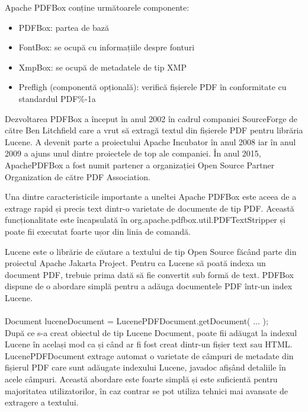 \documentclass[12pt]{book}
\begin{document}
Apache PDFBox conține următoarele componente:
\begin{addmargin}[4em]{1em}
	\begin{itemize}
		\item PDFBox: partea de bază
		\item FontBox: se ocupă cu informațiile despre fonturi
		\item XmpBox: se ocupă de metadatele de tip XMP
		\item Prefligh (componentă opțională): verifică fișierele PDF în conformitate cu standardul PDF\%-1a \cite{PDFBoxOfficial}
\end{itemize}
\end{addmargin}

Dezvoltarea PDFBox a început în anul 2002 în cadrul companiei SourceForge de către Ben Litchfield care a vrut să extragă textul din fișierele PDF pentru librăria Lucene. A devenit parte a proiectului Apache Incubator în anul 2008 iar în anul 2009 a ajuns unul dintre proiectele de top ale companiei. În anul 2015, ApachePDFBox a fost numit partener a organizației Open Source Partner Organization de către PDF Association.

Una dintre caracteristicile importante a uneltei Apache PDFBox este aceea de a extrage rapid și precis text dintr-o varietate de documente de tip PDF. Această funcționalitate este încapsulată în org.apache.pdfbox.util.PDFTextStripper și poate fii executat foarte ușor din linia de comandă. 

Lucene este o librărie de căutare a textului de tip Open Source făcând parte din proiectul Apache Jakarta Project. Pentru ca Lucene să poată indexa un document PDF, trebuie prima dată să fie convertit sub formă de text. PDFBox dispune de o abordare simplă pentru a adăuga documentele PDF într-un index Lucene.\\
\\
Document luceneDocument = LucenePDFDocument.getDocument( ... );\\

După ce s-a creat obiectul de tip Lucene Document, poate fii adăugat la indexul Lucene în același mod ca și când ar fi fost creat dintr-un fișier text sau HTML. LucenePDFDocument extrage automat o varietate de câmpuri de metadate din fișierul PDF care sunt adăugate indexului Lucene, javadoc afișând detaliile în acele câmpuri. Această abordare este foarte simplă și este suficientă pentru majoritatea utilizatorilor, în caz contrar se pot utiliza tehnici mai avansate de extragere a textului.\cite{PDFBoxOfficial}
\end{document}
